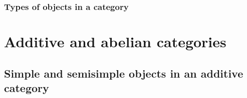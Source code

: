 







\subsubsection{Types of objects in a category}












\section{Additive and abelian categories}



















\subsection{Simple and semisimple objects in an additive category}

